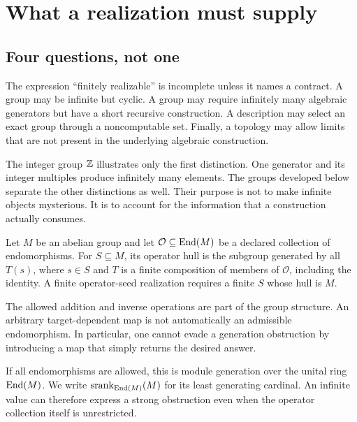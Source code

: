 \chapter{What a realization must supply}
\label{ch:contracts}

\section{Four questions, not one}
The expression ``finitely realizable'' is incomplete unless it names a contract. A group may be infinite but cyclic. A group may require infinitely many algebraic generators but have a short recursive construction. A description may select an exact group through a noncomputable set. Finally, a topology may allow limits that are not present in the underlying algebraic construction.

The integer group $\mathbb Z$ illustrates only the first distinction. One generator and its integer multiples produce infinitely many elements. The groups developed below separate the other distinctions as well. Their purpose is not to make infinite objects mysterious. It is to account for the information that a construction actually consumes.

\begin{definition}
Let $M$ be an abelian group and let $\mathcal O\subseteq\operatorname{End}(M)$ be a declared collection of endomorphisms. For $S\subseteq M$, its operator hull is the subgroup generated by all $T(s)$, where $s\in S$ and $T$ is a finite composition of members of $\mathcal O$, including the identity. A finite operator-seed realization requires a finite $S$ whose hull is $M$.
\end{definition}
The allowed addition and inverse operations are part of the group structure. An arbitrary target-dependent map is not automatically an admissible endomorphism. In particular, one cannot evade a generation obstruction by introducing a map that simply returns the desired answer.

If all endomorphisms are allowed, this is module generation over the unital ring $\operatorname{End}(M)$. We write $\operatorname{srank}_{\operatorname{End}(M)}(M)$ for its least generating cardinal. An infinite value can therefore express a strong obstruction even when the operator collection itself is unrestricted.


